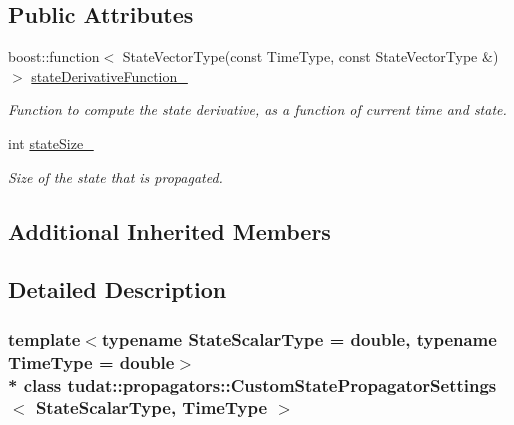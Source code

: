 \subsection*{Public Attributes}
\begin{DoxyCompactItemize}
\item 
boost\+::function$<$ State\+Vector\+Type(const Time\+Type, const State\+Vector\+Type \&) $>$ \hyperlink{classtudat_1_1propagators_1_1CustomStatePropagatorSettings_a863667b49ff6c085bc7cb4e298c3a543}{state\+Derivative\+Function\+\_\+}\hypertarget{classtudat_1_1propagators_1_1CustomStatePropagatorSettings_a863667b49ff6c085bc7cb4e298c3a543}{}\label{classtudat_1_1propagators_1_1CustomStatePropagatorSettings_a863667b49ff6c085bc7cb4e298c3a543}

\begin{DoxyCompactList}\small\item\em Function to compute the state derivative, as a function of current time and state. \end{DoxyCompactList}\item 
int \hyperlink{classtudat_1_1propagators_1_1CustomStatePropagatorSettings_a4f24f1b2ba2e9c1293225a13bc2fd317}{state\+Size\+\_\+}\hypertarget{classtudat_1_1propagators_1_1CustomStatePropagatorSettings_a4f24f1b2ba2e9c1293225a13bc2fd317}{}\label{classtudat_1_1propagators_1_1CustomStatePropagatorSettings_a4f24f1b2ba2e9c1293225a13bc2fd317}

\begin{DoxyCompactList}\small\item\em Size of the state that is propagated. \end{DoxyCompactList}\end{DoxyCompactItemize}
\subsection*{Additional Inherited Members}


\subsection{Detailed Description}
\subsubsection*{template$<$typename State\+Scalar\+Type = double, typename Time\+Type = double$>$\\*
class tudat\+::propagators\+::\+Custom\+State\+Propagator\+Settings$<$ State\+Scalar\+Type, Time\+Type $>$}

